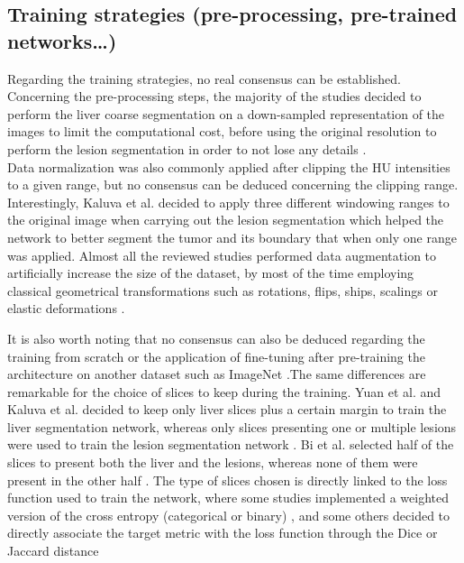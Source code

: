 \subsection{Training strategies (pre-processing, pre-trained networks\ldots{})}

Regarding the training strategies, no real consensus can be established.\\
Concerning the pre-processing steps, the majority of the studies decided
to perform the liver coarse segmentation on a down-sampled
representation of the images to limit the computational cost, before
using the original resolution to perform the lesion segmentation in
order to not lose any details \cite{Li2018, Han2017, Yuan2017, Kaluva2018, Vorontsov2018}.\\
Data normalization was also commonly applied after clipping the HU
intensities to a given range, but no consensus can be deduced concerning
the clipping range. Interestingly, Kaluva et al. decided to
apply three different windowing ranges to the original image when carrying
out the lesion segmentation which helped the network to better segment the tumor and its boundary that when only one range was applied.
Almost all the reviewed studies performed data augmentation to
artificially increase the size of the dataset, by most of the time
employing classical geometrical transformations such as rotations,
flips, ships, scalings or elastic deformations \cite{Frid-adar2017, Ben-Cohen, Rafiei2018, Christ2017, Li2018, Han2017, Yuan2017, Bellver2017, Bi2017, Vorontsov2018}.

It is also worth noting that no consensus can also be deduced regarding the
training from scratch or the application of fine-tuning after
pre-training the architecture on another dataset such as ImageNet \cite{Bi2017, Bellver2017, Christ2017} .The same differences are remarkable for the choice of slices to
keep during the training. Yuan et al. and Kaluva et al. decided to keep only liver slices plus a certain margin to train the
liver segmentation network, whereas only slices presenting one or
multiple lesions were used to train the lesion segmentation network \cite{Yuan2017, Kaluva2018}.
Bi et al. selected half of the slices to present both the liver
and the lesions, whereas none of them were present in the other half \cite{Bi2017}.
The type of slices chosen is directly linked to the loss function used
to train the network, where some studies implemented a weighted version
of the cross entropy (categorical or binary) \cite{Han2017, Bellver2017, Ben-Cohen, Christ2017}, and some others decided to directly associate the target metric
with the loss function through the Dice or Jaccard distance \cite{Yuan2017, Chlebus2018, Vorontsov2018}

